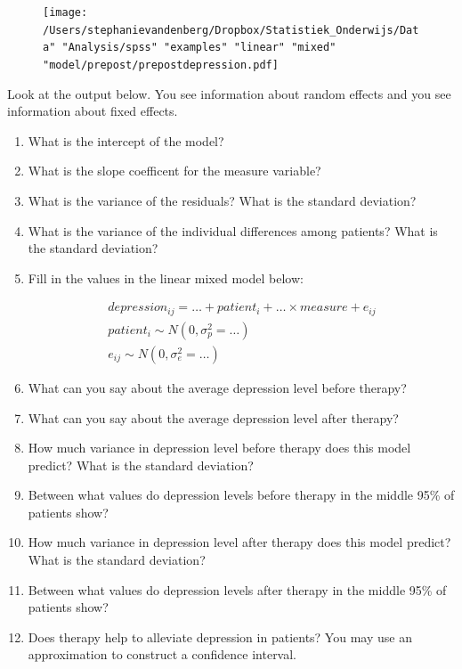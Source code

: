 \documentclass[]{book}\usepackage[]{graphicx}\usepackage[]{color}
\begin{document}
\begin{figure}[h]
    \begin{center}
       \texttt{[image: /Users/stephanievandenberg/Dropbox/Statistiek\_Onderwijs/Data" "Analysis/spss" "examples" "linear" "mixed" "model/prepost/prepostdepression.pdf]}
    \end{center}
\end{figure}


Look at the output below. You see information about random effects and you see information about fixed effects. 

\begin{enumerate}
\item What is the intercept of the model?\\
\item  What is the slope coefficent for the measure variable?\\
\item  What is the variance of the residuals? What is the standard deviation?\\
\item  What is the variance of the individual differences among patients? What is the standard deviation?\\
\item  Fill in the values in the linear mixed model below:

\begin{eqnarray}
depression_{ij} = \dots + patient_i + \dots \times measure + e_{ij} \\
patient_i \sim N(0, \sigma_p^2 = \dots)\\
e_{ij} \sim N(0, \sigma_e^2 = \dots)
\end{eqnarray}


\item  What can you say about the average depression level before therapy? \\
\item  What can you say about the average depression level after therapy?\\
\item  How much variance in depression level before therapy does this model predict? What is the standard deviation? \\
\item  Between what values do depression levels before therapy in the middle 95\% of patients show?\\
\item  How much variance in depression level after therapy does this model predict? What is the standard deviation? \\
\item  Between what values do depression levels after therapy in the middle 95\% of patients show?\\
\item  Does therapy help to alleviate depression in patients? You may use an approximation to construct a confidence interval.


\end{enumerate}
\end{document}
